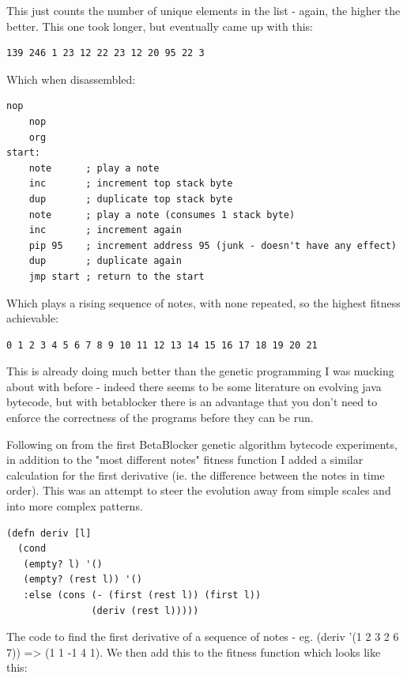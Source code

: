 \documentclass[letterpaper, 12pt]{article}
\begin{document}
This just counts the number of unique elements in the list - again, the higher the better. This one took longer, but eventually came up with this:  

\begin{Verbatim}[fontfamily=courier, xleftmargin=\parindent]
139 246 1 23 12 22 23 12 20 95 22 3
\end{Verbatim}

Which when disassembled:

\begin{Verbatim}[fontfamily=courier, xleftmargin=\parindent]
    nop
    nop
    org
start:
    note      ; play a note
    inc       ; increment top stack byte
    dup       ; duplicate top stack byte
    note      ; play a note (consumes 1 stack byte)
    inc       ; increment again
    pip 95    ; increment address 95 (junk - doesn't have any effect)
    dup       ; duplicate again
    jmp start ; return to the start
\end{Verbatim}

Which plays a rising sequence of notes, with none repeated, so the highest fitness achievable:

\begin{Verbatim}[fontfamily=courier, xleftmargin=\parindent]
0 1 2 3 4 5 6 7 8 9 10 11 12 13 14 15 16 17 18 19 20 21
\end{Verbatim}

This is already doing much better than the genetic programming I was mucking about with before - indeed there seems to be some literature on evolving java bytecode, but with betablocker there is an advantage that you don't need to enforce the correctness of the programs before they can be run.


Following on from the first BetaBlocker genetic algorithm bytecode experiments, in addition to the "most different notes" fitness function I added a similar calculation for the first derivative (ie. the difference between the notes in time order). This was an attempt to steer the evolution away from simple scales and into more complex patterns.

\begin{Verbatim}[fontfamily=courier, xleftmargin=\parindent]
(defn deriv [l]
  (cond
   (empty? l) '()
   (empty? (rest l)) '()
   :else (cons (- (first (rest l)) (first l))
               (deriv (rest l)))))
\end{Verbatim}
	       
The code to find the first derivative of a sequence of notes - eg. (deriv '(1 2 3 2 6 7)) => (1 1 -1 4 1). We then add this to the fitness function which looks like this:
\end{document}
